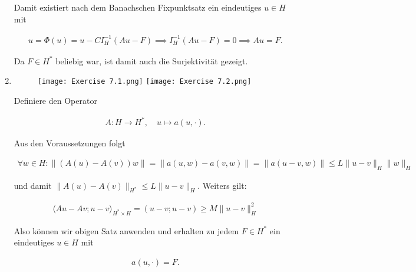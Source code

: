 \begin{solution}
\begin{enumerate}[label = \textbf{\alph*)}]
  Damit existiert nach dem Banachschen Fixpunktsatz ein eindeutiges $u \in H$ mit

  \begin{align*}
    u = \Phi(u) = u - CI_H^{-1}(Au - F)
    \implies I_H^{-1}(Au - F) = 0 \implies Au = F.
  \end{align*}

  Da $F \in H^*$ beliebig war, ist damit auch die Surjektivität gezeigt.

  \item \phantom{}
  
  \begin{figure}[h!]
    \centering
    \texttt{[image: Exercise 7.1.png]}
    \texttt{[image: Exercise 7.2.png]}
  \end{figure}

  Definiere den Operator

  \begin{align*}
    A: H \to H^*, \quad u \mapsto a(u,\cdot).
  \end{align*}

  Aus den Voraussetzungen folgt

  \begin{align*}
    \forall w \in H: \|(A(u)- A(v))w\| = \|a(u,w) - a(v,w)\| = \|a(u - v,w)\| \leq L\|u-v\|_H\|w\|_H
  \end{align*}

  und damit $\|A(u) - A(v)\|_{H^*} \leq L\|u-v\|_H$.
  Weiters gilt:

  \begin{align*}
    \langle Au - Av; u - v \rangle_{H^*\times H} = (u - v; u - v) \geq M\|u-v\|_H^2
  \end{align*}

  Also können wir obigen Satz anwenden und erhalten zu jedem $F \in H^*$ ein eindeutiges $u \in H$ mit

  \begin{align*}
    a(u,\cdot) = F.
  \end{align*}

\end{enumerate}

\end{solution}

